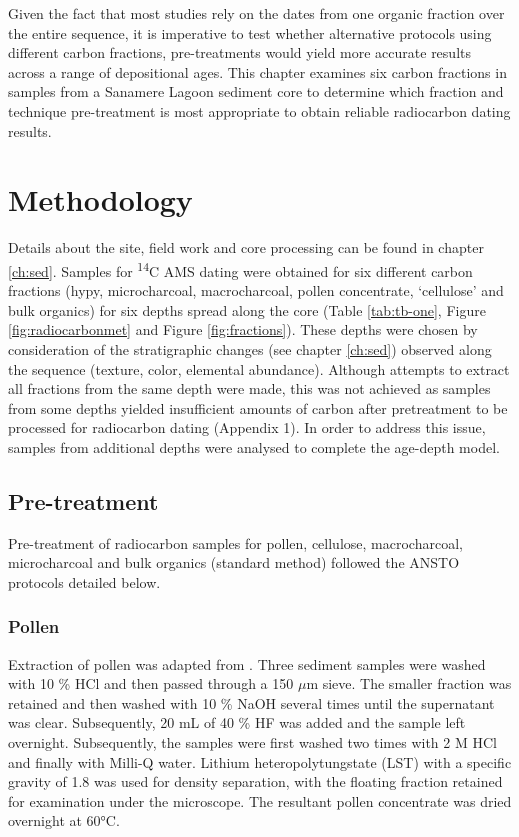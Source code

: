 \documentclass[
  12pt,
]{book}
\begin{document}
Given the fact that most studies rely on the dates from one organic fraction over the entire sequence, it is imperative to test whether alternative protocols using different carbon fractions, pre-treatments would yield more accurate results across a range of depositional ages. This chapter examines six carbon fractions in samples from a Sanamere Lagoon sediment core to determine which fraction and technique pre-treatment is most appropriate to obtain reliable radiocarbon dating results.

\hypertarget{methodology}{%
\section{Methodology}\label{methodology}}

Details about the site, field work and core processing can be found in chapter \ref{ch:sed}. Samples for \textsuperscript{14}C AMS dating were obtained for six different carbon fractions (hypy, microcharcoal, macrocharcoal, pollen concentrate, `cellulose' and bulk organics) for six depths spread along the core (Table \ref{tab:tb-one}, Figure \ref{fig:radiocarbonmet} and Figure \ref{fig:fractions}). These depths were chosen by consideration of the stratigraphic changes (see chapter \ref{ch:sed}) observed along the sequence (texture, color, elemental abundance). Although attempts to extract all fractions from the same depth were made, this was not achieved as samples from some depths yielded insufficient amounts of carbon after pretreatment to be processed for radiocarbon dating (Appendix 1). In order to address this issue, samples from additional depths were analysed to complete the age-depth model.

\hypertarget{pre-treatment}{%
\subsection{Pre-treatment}\label{pre-treatment}}

Pre-treatment of radiocarbon samples for pollen, cellulose, macrocharcoal, microcharcoal and bulk organics (standard method) followed the ANSTO protocols detailed below.

\hypertarget{pollen}{%
\subsubsection{Pollen}\label{pollen}}

Extraction of pollen was adapted from \citet{bennettPollen2002}. Three sediment samples were washed with 10 \% HCl and then passed through a 150 \(\mu\)m sieve. The smaller fraction was retained and then washed with 10 \% NaOH several times until the supernatant was clear. Subsequently, 20 mL of 40 \% HF was added and the sample left overnight. Subsequently, the samples were first washed two times with 2 M HCl and finally with Milli-Q water. Lithium heteropolytungstate (LST) with a specific gravity of 1.8 was used for density separation, with the floating fraction retained for examination under the microscope. The resultant pollen concentrate was dried overnight at 60°C.
\end{document}
